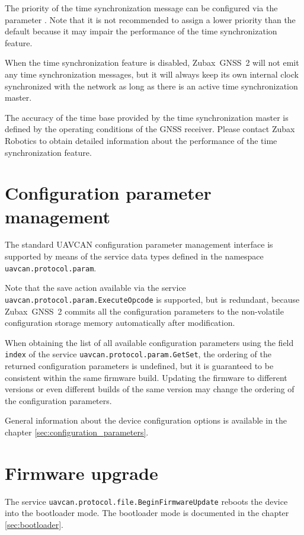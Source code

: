 \documentclass{zubaxdoc}
\begin{document}
The priority of the time synchronization message can be configured via the parameter
.
Note that it is not recommended to assign a lower priority than the default because it may impair
the performance of the time synchronization feature.

When the time synchronization feature is disabled,
Zubax~GNSS~2 will not emit any time synchronization messages,
but it will always keep its own internal clock synchronized with the network
as long as there is an active time synchronization master.

The accuracy of the time base provided by the time synchronization master is defined by the
operating conditions of the GNSS receiver.
Please contact Zubax Robotics to obtain detailed information about the performance of the
time synchronization feature.

\section{Configuration parameter management}

The standard UAVCAN configuration parameter management interface is supported
by means of the service data types defined in the namespace \verb|uavcan.protocol.param|.

Note that the save action available via the service \verb|uavcan.protocol.param.ExecuteOpcode|
is supported, but is redundant, because Zubax~GNSS~2 commits all the configuration parameters
to the non-volatile configuration storage memory automatically after modification.

When obtaining the list of all available configuration parameters using the field \verb|index|
of the service \verb|uavcan.protocol.param.GetSet|, the ordering of the returned configuration
parameters is undefined, but it is guaranteed to be consistent within the same firmware build.
Updating the firmware to different versions or even different builds of the same version
may change the ordering of the configuration parameters.

General information about the device configuration options is available in the chapter 
\ref{sec:configuration_parameters}.

\section{Firmware upgrade}

The service \verb|uavcan.protocol.file.BeginFirmwareUpdate| reboots the device into the bootloader
mode.
The bootloader mode is documented in the chapter \ref{sec:bootloader}.
\end{document}
